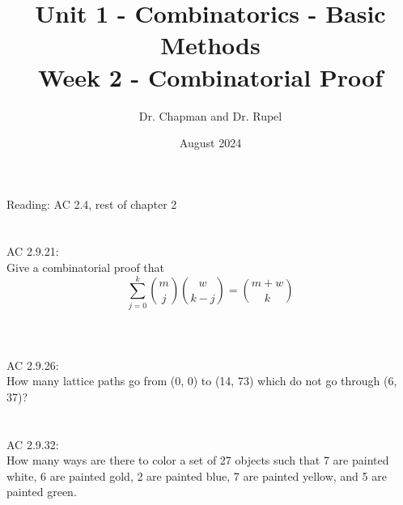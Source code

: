 \documentclass{article}
\title{Unit 1 - Combinatorics - Basic Methods\\ Week 2 - Combinatorial Proof}
\author{Dr. Chapman and Dr. Rupel}
\date{August 2024}
\begin{document}
\maketitle
Reading: AC 2.4, rest of chapter 2
\section{}
AC 2.9.21:\\
Give a combinatorial proof that \[\sum^k_{j=0}\binom{m}{j}\binom{w}{k-j}=\binom{m+w}{k}\]\\
\section{}
AC 2.9.26:\\
How many lattice paths go from (0, 0) to (14, 73) which do not go through (6, 37)?
\section{}
AC 2.9.32:\\
How many ways are there to color a set of 27 objects such that 7 are painted white, 6 are painted gold, 2
are painted blue, 7 are painted yellow, and 5 are painted green.
\end{document}
